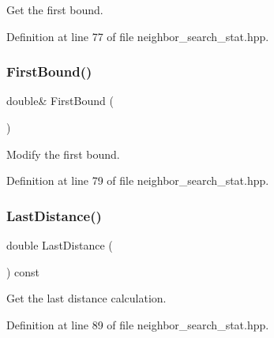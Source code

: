 Get the first bound. 



Definition at line 77 of file neighbor\+\_\+search\+\_\+stat.\+hpp.

\mbox{\label{classmlpack_1_1neighbor_1_1NeighborSearchStat_ac234f5fa604353c256d61cc97c760fa6}} 
\subsubsection{First\+Bound()\hspace{0.1cm}{\footnotesize\ttfamily [2/2]}}
{\footnotesize\ttfamily double\& First\+Bound (\begin{DoxyParamCaption}{ }\end{DoxyParamCaption})\hspace{0.3cm}{\ttfamily [inline]}}



Modify the first bound. 



Definition at line 79 of file neighbor\+\_\+search\+\_\+stat.\+hpp.

\mbox{\label{classmlpack_1_1neighbor_1_1NeighborSearchStat_acf3025848cf3628a9213763886101369}} 
\subsubsection{Last\+Distance()\hspace{0.1cm}{\footnotesize\ttfamily [1/2]}}
{\footnotesize\ttfamily double Last\+Distance (\begin{DoxyParamCaption}{ }\end{DoxyParamCaption}) const\hspace{0.3cm}{\ttfamily [inline]}}



Get the last distance calculation. 



Definition at line 89 of file neighbor\+\_\+search\+\_\+stat.\+hpp.

